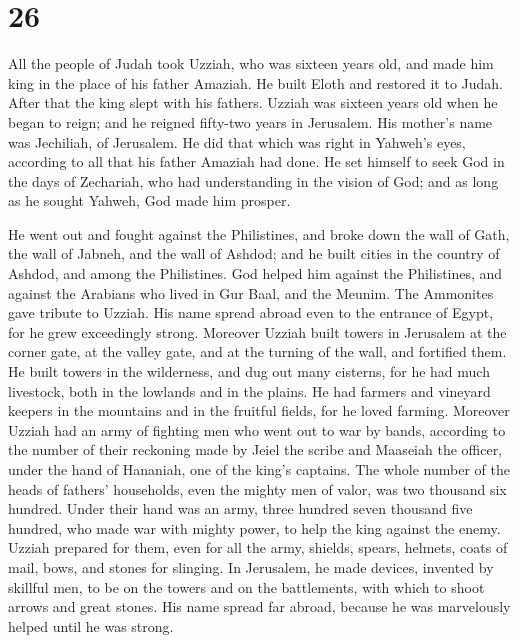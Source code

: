 \hypertarget{section-25}{%
\section{26}\label{section-25}}

 All the people of Judah took Uzziah, who was sixteen
years old, and made him king in the place of his father Amaziah.
 He built Eloth and restored it to Judah. After that the
king slept with his fathers.  Uzziah was sixteen years old
when he began to reign; and he reigned fifty-two years in Jerusalem. His
mother's name was Jechiliah, of Jerusalem.  He did that
which was right in Yahweh's eyes, according to all that his father
Amaziah had done.  He set himself to seek God in the days
of Zechariah, who had understanding in the vision of God; and as long as
he sought Yahweh, God made him prosper.

 He went out and fought against the Philistines, and broke
down the wall of Gath, the wall of Jabneh, and the wall of Ashdod; and
he built cities in the country of Ashdod, and among the Philistines.
 God helped him against the Philistines, and against the
Arabians who lived in Gur Baal, and the Meunim.  The
Ammonites gave tribute to Uzziah. His name spread abroad even to the
entrance of Egypt, for he grew exceedingly strong. 
Moreover Uzziah built towers in Jerusalem at the corner gate, at the
valley gate, and at the turning of the wall, and fortified them.
 He built towers in the wilderness, and dug out many
cisterns, for he had much livestock, both in the lowlands and in the
plains. He had farmers and vineyard keepers in the mountains and in the
fruitful fields, for he loved farming.  Moreover Uzziah
had an army of fighting men who went out to war by bands, according to
the number of their reckoning made by Jeiel the scribe and Maaseiah the
officer, under the hand of Hananiah, one of the king's captains.
 The whole number of the heads of fathers' households,
even the mighty men of valor, was two thousand six hundred.
 Under their hand was an army, three hundred seven
thousand five hundred, who made war with mighty power, to help the king
against the enemy.  Uzziah prepared for them, even for
all the army, shields, spears, helmets, coats of mail, bows, and stones
for slinging.  In Jerusalem, he made devices, invented by
skillful men, to be on the towers and on the battlements, with which to
shoot arrows and great stones. His name spread far abroad, because he
was marvelously helped until he was strong.

